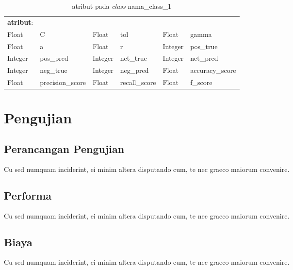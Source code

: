 \begin{small}
	\begin{longtable}[c]{|p{1.5cm} p{2.3cm} p{1.5cm} p{2.3cm} p{1.5cm} p{2.3cm}|}
		\caption{atribut pada \textit{class} nama\_class\_1}\\
		\hline
		
		\textbf{atribut}: & & & & &\\
		Float & C & Float & tol & Float & gamma \\ 
		Float & a & Float & r & Integer & pos\_true \\ 
		Integer & pos\_pred & Integer & net\_true & Integer & net\_pred \\ 
		Integer & neg\_true & Integer & neg\_pred & Float & accuracy\_score \\ 
		Float & precision\_score & Float & recall\_score & Float & f\_score \\ \hline
		
	\end{longtable}
\end{small}

\section{Pengujian}
\subsection{Perancangan Pengujian}
Cu sed numquam inciderint, ei minim altera disputando cum, te nec graeco maiorum convenire.\\
\subsection{Performa}
Cu sed numquam inciderint, ei minim altera disputando cum, te nec graeco maiorum convenire.\\
\subsection{Biaya}
Cu sed numquam inciderint, ei minim altera disputando cum, te nec graeco maiorum convenire.\\